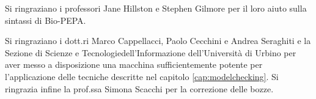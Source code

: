 \documentclass[a4paper,twoside,11pt]{report}
\begin{document}
	
	
	\copertinatesi 
	\indice
	\indicefigure
	\indicetabelle
	\iniziatesto
	
	
	
	
	
	
	
	
	
	\appendix
	
	\printbibliography %

	
	\ringraziamenti
		Si ringraziano i professori Jane Hillston e Stephen Gilmore per il loro aiuto sulla sintassi di Bio-PEPA.
		
		Si ringraziano i dott.ri Marco Cappellacci, Paolo Cecchini e Andrea Seraghiti e la Sezione di Scienze e Tecnologiedell'Informazione dell'Universit\`a di Urbino per aver messo a disposizione una macchina sufficientemente potente per l'applicazione delle tecniche descritte nel capitolo \ref{cap:modelchecking}.
		Si ringrazia infine la prof.ssa Simona Scacchi per la correzione delle bozze.
		
\end{document}
